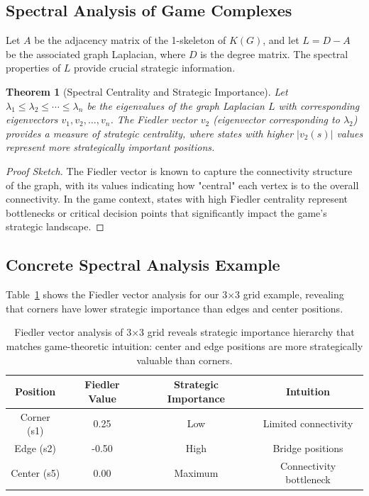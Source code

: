 \documentclass{article}
\newtheorem{theorem}{Theorem}
\begin{document}
\subsection{Spectral Analysis of Game Complexes}

Let $A$ be the adjacency matrix of the 1-skeleton of $K(G)$, and let $L = D - A$ be the associated graph Laplacian, where $D$ is the degree matrix. The spectral properties of $L$ provide crucial strategic information.

\begin{theorem}[Spectral Centrality and Strategic Importance]
Let $\lambda_1 \leq \lambda_2 \leq \cdots \leq \lambda_n$ be the eigenvalues of the graph Laplacian $L$ with corresponding eigenvectors $v_1, v_2, \ldots, v_n$. The Fiedler vector $v_2$ (eigenvector corresponding to $\lambda_2$) provides a measure of strategic centrality, where states with higher $|v_2(s)|$ values represent more strategically important positions.
\end{theorem}

\begin{proof}[Proof Sketch]
The Fiedler vector is known to capture the connectivity structure of the graph, with its values indicating how "central" each vertex is to the overall connectivity. In the game context, states with high Fiedler centrality represent bottlenecks or critical decision points that significantly impact the game's strategic landscape.
\end{proof}

\subsection{Concrete Spectral Analysis Example}

Table~\ref{tab:fiedler_example} shows the Fiedler vector analysis for our 3×3 grid example, revealing that corners have lower strategic importance than edges and center positions.

\begin{table}[ht]
\centering
\begin{tabular}{|c|c|c|c|}
\hline
\textbf{Position} & \textbf{Fiedler Value} & \textbf{Strategic Importance} & \textbf{Intuition} \\
\hline
Corner (s1) & 0.25 & Low & Limited connectivity \\
Edge (s2) & -0.50 & High & Bridge positions \\
Center (s5) & 0.00 & Maximum & Connectivity bottleneck \\
\hline
\end{tabular}
\caption{Fiedler vector analysis of 3×3 grid reveals strategic importance hierarchy that matches game-theoretic intuition: center and edge positions are more strategically valuable than corners.}
\label{tab:fiedler_example}
\end{table}
\end{document}
